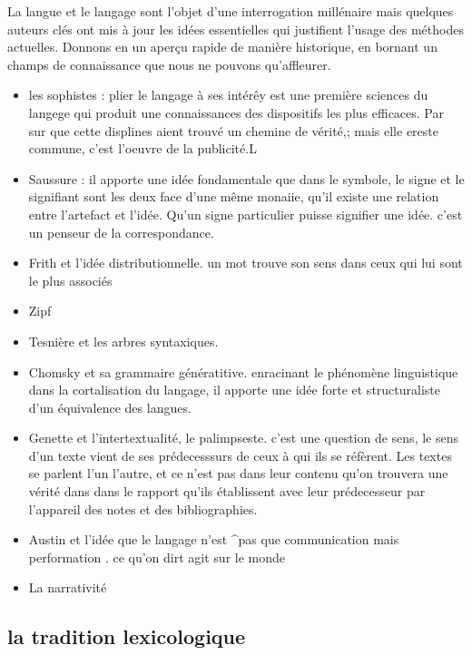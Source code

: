 \documentclass[
]{book}
\providecommand{\tightlist}{%
  \setlength{\itemsep}{0pt}\setlength{\parskip}{0pt}}
\begin{document}
La langue et le langage sont l'objet d'une interrogation millénaire mais quelques auteurs clés ont mis à jour les idées essentielles qui justifient l'usage des méthodes actuelles. Donnons en un aperçu rapide de manière historique, en bornant un champs de connaissance que nous ne pouvons qu'affleurer.

\begin{itemize}
\tightlist
\item
  les sophistes : plier le langage à ses intérêy est une première sciences du langege qui produit une connaissances des dispositifs les plus efficaces. Par sur que cette displines aient trouvé un chemine de vérité,; mais elle ereste commune, c'est l'oeuvre de la publicité.L
\item
  Saussure : il apporte une idée fondamentale que dans le symbole, le signe et le signifiant sont les deux face d'une même monaiie, qu'il existe une relation entre l'artefact et l'idée. Qu'un signe particulier puisse signifier une idée. c'est un penseur de la correspondance.
\item
  Frith et l'idée distributionnelle. un mot trouve son sens dans ceux qui lui sont le plus associés
\item
  Zipf
\item
  Tesnière et les arbres syntaxiques.
\item
  Chomsky et sa grammaire génératitive. enracinant le phénomène linguistique dans la cortalisation du langage, il apporte une idée forte et structuraliste d'un équivalence des langues.
\item
  Genette et l'intertextualité, le palimpseste. c'est une question de sens, le sens d'un texte vient de ses prédecesssurs de ceux à qui ils se réfèrent. Les textes se parlent l'un l'autre, et ce n'est pas dans leur contenu qu'on trouvera une vérité dans dans le rapport qu'ils établissent avec leur prédecesseur par l'appareil des notes et des bibliographies.
\item
  Austin et l'idée que le langage n'est \^{}pas que communication mais performation . ce qu'on dirt agit sur le monde
\item
  La narrativité
\end{itemize}

\hypertarget{la-tradition-lexicologique}{%
\subsection{la tradition lexicologique}\label{la-tradition-lexicologique}}
\end{document}
